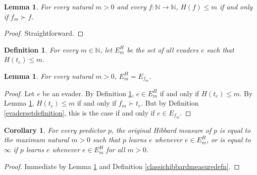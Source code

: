 \documentclass{article}
\newtheorem{definition}[theorem]{Definition}
\newtheorem{corollary}[theorem]{Corollary}
\newtheorem{lemma}[theorem]{Lemma}
\begin{document}
\begin{lemma}
\label{straightfwdtechnicallemma}
    For every natural $m>0$ and every $f:\mathbb N\to\mathbb N$,
    $H(f)\leq m$ if and only if $f_m\succ f$.
\end{lemma}

\begin{proof}
    Straightforward.
\end{proof}

\begin{definition}
\label{variationondefinitionofEdefn}
    For every $m\in\mathbb N$, let $E^H_m$
    be the set of all evaders $e$ such that $H(t_e)\leq m$.
\end{definition}

\begin{lemma}
\label{equivalenceoftwoevadersetslemma}
    For every natural $m>0$, $E^H_m=E_{f_m}$.
\end{lemma}

\begin{proof}
    Let $e$ be an evader. By Definition \ref{variationondefinitionofEdefn},
    $e\in E^H_m$ if and only if $H(t_e)\leq m$.
    By Lemma \ref{straightfwdtechnicallemma}, $H(t_e)\leq m$ if and only if
    $f_m\succ t_e$. But by Definition \ref{evadersetdefinition}, this is the
    case if and only if $e\in E_{f_m}$.
\end{proof}

\begin{corollary}
\label{rephrasinghibbardsmeasurecorollary}
    For every predictor $p$, the original Hibbard measure of $p$
    is equal to the maximum natural $m>0$ such that
    $p$ learns $e$ whenever $e\in E^H_m$, or is equal to $\infty$
    if $p$ learns $e$ whenever $e\in E^H_m$ for all $m>0$.
\end{corollary}

\begin{proof}
    Immediate by Lemma \ref{equivalenceoftwoevadersetslemma}
    and Definition \ref{classichibbardmeasuredefn}.
\end{proof}
\end{document}
